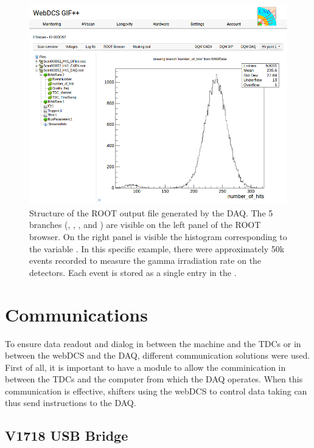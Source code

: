     \begin{figure}[H]
		\centering
		\includegraphics[width = \plotwidth]{fig/app1/webDCS-ROOT-browser.png}
		\caption{\label{fig:ROOTfile} Structure of the ROOT output file generated by the DAQ. The 5 branches (, , ,  and ) are visible on the left panel of the ROOT browser. On the right panel is visible the histogram corresponding to the variable . In this specific example, there were approximately 50k events recorded to measure the gamma irradiation rate on the detectors. Each event is stored as a single entry in the .}
	\end{figure}
	
\section{Communications}
\label{app1:sec:Comm}

	To ensure data readout and dialog in between the machine and the TDCs or in between the webDCS and the DAQ, different communication solutions were used. First of all, it is important to have a module to allow the comminication in between the TDCs and the computer from which the DAQ operates. When this communication is effective, shifters using the webDCS to control data taking can thus send instructions to the DAQ.\\

    \subsection{V1718 USB Bridge}
    \label{app1:ssec:V1718}
    

